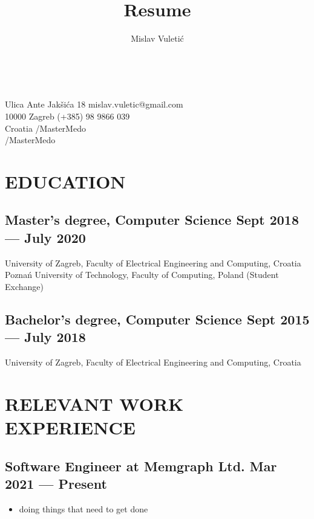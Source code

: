 \documentclass{article}
\begin{document}
\title{Resume}
\author{Mislav Vuletić}

\Huge\bfseries\theauthor\

\mdseries\large

Ulica Ante Jakšića 18 \hfill mislav.vuletic@gmail.com\\
10000 Zagreb                    \hfill {} (+385) 98 9866 039\\
Croatia                         \hfill {}/MasterMedo\\
\-                              \hfill {}/MasterMedo

\normalsize

\section{EDUCATION}
\subsection{Master's degree, Computer Science \hfill Sept 2018 --- July 2020}
University of Zagreb, Faculty of Electrical Engineering and Computing, Croatia\\
Poznań University of Technology, Faculty of Computing, Poland (Student Exchange)

\subsection{Bachelor's degree, Computer Science \hfill Sept 2015 --- July 2018}
University of Zagreb, Faculty of Electrical Engineering and Computing, Croatia


\section{RELEVANT WORK EXPERIENCE}
\subsection{Software Engineer at Memgraph Ltd. \hfill Mar 2021 --- Present}
\begin{itemize}
  \itemsep0em
  \item doing things that need to get done
\end{itemize}
\end{document}
